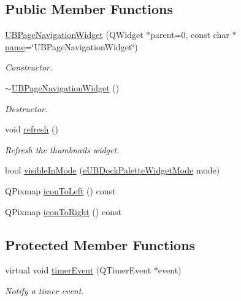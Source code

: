 \subsection*{Public Member Functions}
\begin{DoxyCompactItemize}
\item 
\hyperlink{class_u_b_page_navigation_widget_a26f09b6db659eef3ab1fa3b857459b94}{U\-B\-Page\-Navigation\-Widget} (Q\-Widget $\ast$parent=0, const char $\ast$\hyperlink{class_u_b_dock_palette_widget_a1c7779c0584c0d2541b4c05acc1ffbbb}{name}=\char`\"{}U\-B\-Page\-Navigation\-Widget\char`\"{})
\begin{DoxyCompactList}\small\item\em Constructor. \end{DoxyCompactList}\item 
\hyperlink{class_u_b_page_navigation_widget_a5e5839945df49e97fc8097601d98e31d}{$\sim$\-U\-B\-Page\-Navigation\-Widget} ()
\begin{DoxyCompactList}\small\item\em Destructor. \end{DoxyCompactList}\item 
void \hyperlink{class_u_b_page_navigation_widget_a5e198d18c1d90d7e0ef1f9425c4c3ab8}{refresh} ()
\begin{DoxyCompactList}\small\item\em Refresh the thumbnails widget. \end{DoxyCompactList}\item 
bool \hyperlink{class_u_b_page_navigation_widget_a55ecb91d1b812e633fd48c6a62038a96}{visible\-In\-Mode} (\hyperlink{_u_b_dock_palette_widget_8h_af3b2828ed1bf91ad13c73e4e1b3b529e}{e\-U\-B\-Dock\-Palette\-Widget\-Mode} mode)
\item 
Q\-Pixmap \hyperlink{class_u_b_page_navigation_widget_ab7aa80f9d977b641ffe4a1c8edd456b3}{icon\-To\-Left} () const 
\item 
Q\-Pixmap \hyperlink{class_u_b_page_navigation_widget_a165996a524aa6a8416b82f1575212ac4}{icon\-To\-Right} () const 
\end{DoxyCompactItemize}
\subsection*{Protected Member Functions}
\begin{DoxyCompactItemize}
\item 
virtual void \hyperlink{class_u_b_page_navigation_widget_ac1bc151ba98ff3623a67fc23c08f8125}{timer\-Event} (Q\-Timer\-Event $\ast$event)
\begin{DoxyCompactList}\small\item\em Notify a timer event. \end{DoxyCompactList}\end{DoxyCompactItemize}
